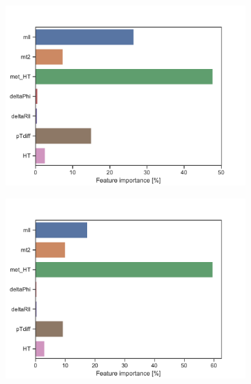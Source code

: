 \begin{figure}[H]
\begin{subfigure}[t!]{0.49\textwidth}
        \includegraphics[width = \textwidth]{Figures/WW/BDT/High_level/Inter/featureImportance.pdf}
        \caption{}
        \label{fig:featWWLow}
    \end{subfigure}
    \begin{subfigure}[t!]{0.49\textwidth}
        \includegraphics[width = \textwidth]{Figures/Mono_Z/ML/BDT/High_level/Inter/featureImportance.pdf}
        \caption{}
        \label{fig:featMonoZLow}
    \end{subfigure}
    \caption{}
    \label{fig:resExample}
\end{figure}

